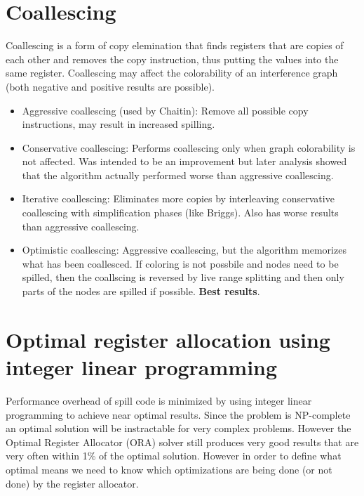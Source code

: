 \documentclass[a4paper,10pt]{article}
\begin{document}
\section{Coallescing}
Coallescing is a form of copy elemination that finds registers that are copies of each other and removes the copy instruction, thus
putting the values into the same register. Coallescing may affect the colorability of an interference graph (both negative and positive
results are possible).
\begin{itemize}
 \item Aggressive coallescing (used by Chaitin): Remove all possible copy instructions, may result in increased spilling.
 \item Conservative coallescing: Performs coallescing only when graph colorability is not affected. Was intended to be an improvement but
       later analysis showed that the algorithm actually performed worse than aggressive coallescing.
 \item Iterative coallescing: Eliminates more copies by interleaving conservative coallescing with simplification phases (like Briggs).
       Also has worse results than aggressive coallescing.
 \item Optimistic coallescing: Aggressive coallescing, but the algorithm memorizes what has been coallesced. If coloring is not possbile
       and nodes need to be spilled, then the coallscing is reversed by live range splitting and then only parts of the nodes are spilled
       if possible. \textbf{Best results}.
\end{itemize}

\section{Optimal register allocation using integer linear programming}
Performance overhead of spill code is minimized by using integer linear programming to achieve near optimal results. Since the problem is
NP-complete an optimal solution will be instractable for very complex problems. However the Optimal Register Allocator (ORA) solver still
produces very good results that are very often within 1\% of the optimal solution. However in order to define what optimal means we need
to know which optimizations are being done (or not done) by the register allocator.\\
\end{document}
